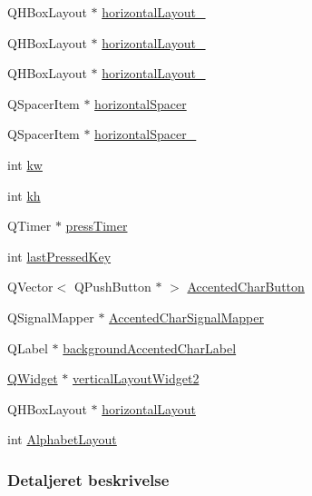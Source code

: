 \begin{DoxyCompactItemize}
\item 
Q\+H\+Box\+Layout $\ast$ \hyperlink{class_q_virtual_keyboard_a535a43287b7a5605cfc11580d146d3fb}{horizontal\+Layout\+\_}
\item 
Q\+H\+Box\+Layout $\ast$ \hyperlink{class_q_virtual_keyboard_af1b2167ad3027fe2c2328701164e54ec}{horizontal\+Layout\+\_}
\item 
Q\+H\+Box\+Layout $\ast$ \hyperlink{class_q_virtual_keyboard_aeb3eff1a8b0673c92f1ed957263d272b}{horizontal\+Layout\+\_}
\item 
Q\+Spacer\+Item $\ast$ \hyperlink{class_q_virtual_keyboard_a7e1d33086b18025c1f6a73ee4b080442}{horizontal\+Spacer}
\item 
Q\+Spacer\+Item $\ast$ \hyperlink{class_q_virtual_keyboard_ad8c8a25c788a6f06d18143815745542c}{horizontal\+Spacer\+\_}
\item 
int \hyperlink{class_q_virtual_keyboard_a5a953764bcaf68b8491ec52111189e31}{kw}
\item 
int \hyperlink{class_q_virtual_keyboard_ac85dabb3c71c98632f077058f4bbe3c7}{kh}
\item 
Q\+Timer $\ast$ \hyperlink{class_q_virtual_keyboard_a050363eca09454d325785185e147a3b3}{press\+Timer}
\item 
int \hyperlink{class_q_virtual_keyboard_ab0906b0492ca8865fd2db9547599636f}{last\+Pressed\+Key}
\item 
Q\+Vector$<$ Q\+Push\+Button $\ast$ $>$ \hyperlink{class_q_virtual_keyboard_aeeb3a644e1608dbbf2b68462e1615fef}{Accented\+Char\+Button}
\item 
Q\+Signal\+Mapper $\ast$ \hyperlink{class_q_virtual_keyboard_a8d1ccfcfe491a906a540bfc0e7532166}{Accented\+Char\+Signal\+Mapper}
\item 
Q\+Label $\ast$ \hyperlink{class_q_virtual_keyboard_a6853ae9cfabf643af6b7acb814ffa6a1}{background\+Accented\+Char\+Label}
\item 
\hyperlink{class_q_widget}{Q\+Widget} $\ast$ \hyperlink{class_q_virtual_keyboard_a6cae2ca1d83910c66adfc69bc57a770d}{vertical\+Layout\+Widget2}
\item 
Q\+H\+Box\+Layout $\ast$ \hyperlink{class_q_virtual_keyboard_a9ca831b3e7278c1cc7cebba2329486b4}{horizontal\+Layout}
\item 
int \hyperlink{class_q_virtual_keyboard_a5f4c5779dd39f7a3602aed3a8dff9054}{Alphabet\+Layout}
\end{DoxyCompactItemize}


\subsubsection{Detaljeret beskrivelse}


